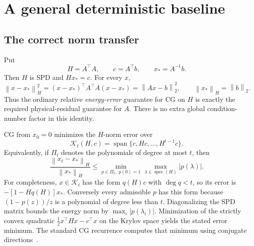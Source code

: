\documentclass[11pt,a4paper]{article}
\newcommand{\spec}{\operatorname{spec}}
\newcommand{\norm}[1]{\left\lVert #1\right\rVert}
\theoremstyle{definition}
\theoremstyle{remark}
\begin{document}
\section{A general deterministic baseline}
\label{sec:cg}
\subsection{The correct norm transfer}
Put
\[
 H=A^\top A,\qquad c=A^\top b,\qquad x_*=A^{-1}b.
\]
Then $H$ is SPD and $Hx_*=c$. For every $x$,
\begin{equation}
 \norm{x-x_*}_H^2
 =(x-x_*)^\top A^\top A(x-x_*)
 =\norm{Ax-b}_2^2,
 \qquad \norm{x_*}_H=\norm b_2. \label{eq:energy-identity}
\end{equation}
Thus the ordinary relative \emph{energy-error} guarantee for CG on $H$ is exactly the required physical-residual guarantee for $A$. There is no extra global condition-number factor in this identity.

CG from $x_0=0$ minimizes the $H$-norm error over
\[
 \mathcal K_t(H,c)=\operatorname{span}\{c,Hc,\ldots,H^{t-1}c\}.
\]
Equivalently, if $\Pi_t$ denotes the polynomials of degree at most $t$, then
\begin{equation}
 \frac{\norm{x_t-x_*}_H}{\norm{x_*}_H}
 \le \min_{p\in\Pi_t,\;p(0)=1}\max_{\lambda\in\spec(H)}|p(\lambda)|.
 \label{eq:cg-polynomial}
\end{equation}
For completeness, $x\in\mathcal K_t$ has the form $q(H)c$ with $\deg q<t$, so its error is $-[1-Hq(H)]x_*$. Conversely every admissible $p$ has this form because $(1-p(z))/z$ is a polynomial of degree less than $t$. Diagonalizing the SPD matrix bounds the energy norm by $\max_i|p(\lambda_i)|$. Minimization of the strictly convex quadratic $\tfrac12x^\top Hx-c^\top x$ on the Krylov space yields the stated error minimum. The standard CG recurrence computes that minimum using conjugate directions~\cite{hs}.
\end{document}
